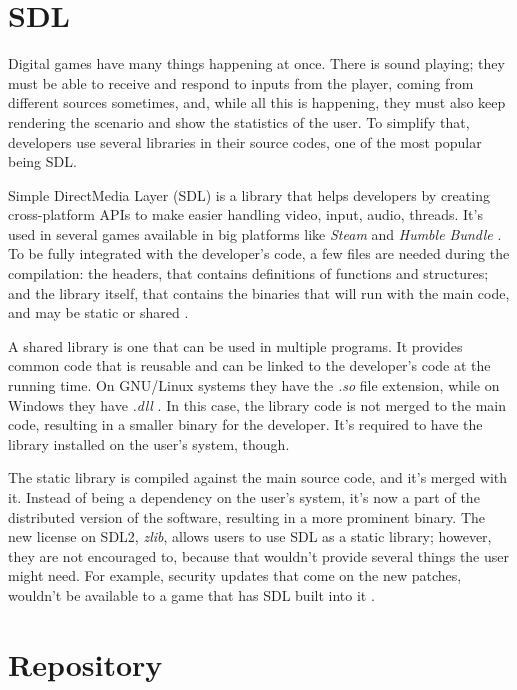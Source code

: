 \section{SDL}
\label {sec:sdl}

Digital games have many things happening at once. There is sound playing; they must be able to receive and respond to inputs from the player, coming from different sources sometimes, and, while all this is happening, they must also keep rendering the scenario and show the statistics of the user. To simplify that, developers use several libraries in their source codes, one of the most popular being SDL.

Simple DirectMedia Layer (SDL) is a library that helps developers by creating cross-platform APIs to make easier handling video, input, audio, threads. It's used in several games available in big platforms like \textit{Steam} and \textit{Humble Bundle} \cite{sdl2017}. To be fully integrated with the developer's code, a few files are needed during the compilation: the headers, that contains definitions of functions and structures; and the library itself, that contains the binaries that will run with the main code, and may be static or shared \cite{mitchell2013sdl}.

A shared library is one that can be used in multiple programs. It provides common code that is reusable and can be linked to the developer's code at the running time. On GNU/Linux systems they have the \textit{.so} file extension, while on Windows they have \textit{.dll} \cite{campbell2009algorithms}. In this case, the library code is not merged to the main code, resulting in a smaller binary for the developer. It's required to have the library installed on the user's system, though.

The static library is compiled against the main source code, and it's merged with it. Instead of being a dependency on the user's system, it's now a part of the distributed version of the software, resulting in a more prominent binary. The new license on SDL2, \textit{zlib}\footnotemark, allows users to use SDL as a static library; however, they are not encouraged to, because that wouldn't provide several things the user might need. For example, security updates that come on the new patches, wouldn't be available to a game that has SDL built into it \cite{ryangordon2017}.



\section{Repository}
\label {sec:repository}

